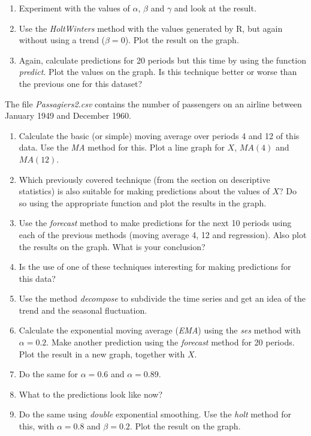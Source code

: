 \begin{exercise}
\begin{enumerate}
    \item Experiment with the values of $\alpha$, $\beta$ and $\gamma$ and look at the result.
    \item Use the \emph{HoltWinters} method with the values generated by R, but again without using a trend ($\beta=0$). Plot the result on the graph.
    \item Again, calculate predictions for 20 periods but this time by using the function \emph{predict}. Plot the values on the graph. Is this technique better or worse than the previous one for this dataset?
  \end{enumerate}	
  \end{exercise}
  
  \begin{exercise}
  The file \emph{Passagiers2.csv} contains the number of passengers on an airline between January 1949 and December 1960.
  \begin{enumerate}
    \item Calculate the basic (or simple) moving average over periods 4 and 12 of this data. Use the \emph{MA} method for this. Plot a line graph for $X$, $MA(4)$ and $MA(12)$.
    \item Which previously covered technique (from the section on descriptive statistics) is also suitable for making predictions about the values of $X$? Do so using the appropriate function and plot the results in the graph.
    \item Use the \emph{forecast} method to make predictions for the next 10 periods using each of the previous methods (moving average 4, 12 and regression). Also plot the results on the graph. What is your conclusion?
    \item Is the use of one of these techniques interesting for making predictions for this data?
    \item Use the method \emph{decompose} to subdivide the time series and get an idea of the trend and the seasonal fluctuation.
    \item Calculate the exponential moving average (\emph{EMA}) using the \emph{ses} method with $\alpha=0.2$. Make another prediction using the \emph{forecast} method for 20 periods. Plot the result in a new graph, together with $X$.
    \item Do the same for $\alpha=0.6$ and $\alpha=0.89$.
    \item What to the predictions look like now?
    \item Do the same using \emph{double} exponential smoothing. Use the \emph{holt} method for this, with $\alpha =  0.8$ and $\beta = 0.2$. Plot the result on the graph.

\end{enumerate}
\end{exercise}
